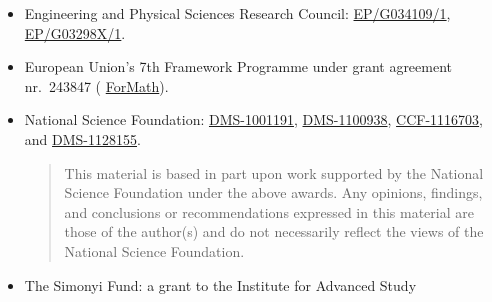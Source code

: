 {\begin{itemize}
\item Engineering and Physical Sciences Research Council: %
   \href{http://gow.epsrc.ac.uk/NGBOViewGrant.aspx?GrantRef=EP/G034109/1}{EP/G034109/1}, %
   \href{http://gow.epsrc.ac.uk/NGBOViewGrant.aspx?GrantRef=EP/G03298X/1}{EP/G03298X/1}. %

\item European Union's 7th Framework Programme under grant agreement nr.\ 243847 (%
\href{http://wiki.portal.chalmers.se/cse/pmwiki.php/ForMath/ForMath/}{ForMath}). %

\item National Science Foundation:
  \href{http://www.nsf.gov/awardsearch/showAward.do?AwardNumber=1001191}{DMS-1001191}, %
  \href{http://www.nsf.gov/awardsearch/showAward.do?AwardNumber=1100938}{DMS-1100938}, %
  \href{http://www.nsf.gov/awardsearch/showAward.do?AwardNumber=1116703}{CCF-1116703}, %
  and 
  \href{http://www.nsf.gov/awardsearch/showAward.do?AwardNumber=1128155}{DMS-1128155}. %
  {
    \setlength{\itemsep}{0pt}
    \begin{quote}
      \noindent\scriptsize
      This material is based in part upon work supported by the
      National Science Foundation under the above awards.  Any opinions,
      findings, and conclusions or recommendations expressed in this
      material are those of the author(s) and do not necessarily reflect the
      views of the National Science Foundation.
    \end{quote}
  }
\item The Simonyi Fund: a grant to the Institute for Advanced Study          %
  \end{itemize}


}
\cleartooddpage

